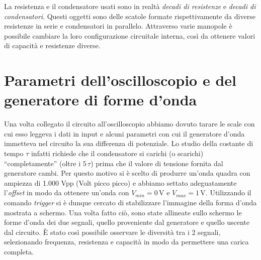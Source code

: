 La resistenza e il condensatore usati sono in realtà \textit{decadi di resistenze} e \textit{decadi di condensatori}. Questi oggetti sono delle scatole formate rispettivamente da diverse resistenze in serie e condensatori in parallelo. Attraverso varie manopole è possibile cambiare la loro configurazione circuitale interna, così da ottenere valori di capacità e resistenze diverse. 

\section{Parametri dell'oscilloscopio e del generatore di forme d'onda}

Una volta collegato il circuito all'oscilloscopio abbiamo dovuto tarare le scale con cui esso leggeva i dati in input e alcuni parametri con cui il generatore d'onda immetteva nel circuito la sua differenza di potenziale. Lo studio della costante di tempo $\tau$ infatti richiede che il condensatore si carichi (o scarichi) ``completamente'' (oltre i $5\,\tau$) prima che il valore di tensione fornita dal generatore cambi. Per questo motivo si è scelto di produrre un'onda quadra con ampiezza di 1.000 Vpp (Volt picco picco) e abbiamo settato adeguatamente l'\emph{offset} %
in modo da ottenere un'onda con $V_{min}=0\,\si{\volt}$ e $V_{max}=1\,\si{\volt}$. Utilizzando il comando \textit{trigger} si è dunque cercato di stabilizzare l'immagine della forma d'onda mostrata a schermo. Una volta fatto ciò, sono state allineate sullo schermo le forme d'onda dei due segnali, quello proveniente dal generatore e quello uscente dal circuito. \`E stato così possibile osservare le diversità tra i 2 segnali, selezionando frequenza, resistenza e capacità in modo da permettere una carica completa.
 